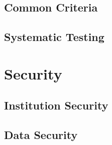 \documentclass{book}
\begin{document}
  \chapter{Common Criteria}

  \chapter{Systematic Testing} %
    


  

\part{Security}

  \chapter{Institution Security}

  \chapter{Data Security} %
    




\end{document}
